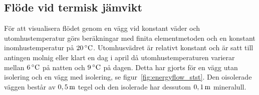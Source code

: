 \subsection{Flöde vid termisk jämvikt}
\label{sec:steadystatewall}


För att visualisera flödet genom en vägg vid konstant väder och utomhustemperatur görs 
beräkningar med finita elementmetoden och en konstant inomhustemperatur på 
$\unit[20]{^\circ C}$. Utomhusvädret är relativt konstant och är satt till antingen molnig 
eller klart en dag i april då utomhustemperaturen varierar mellan $\unit[6]{^\circ C}$ på natten och $\unit[9]{^\circ C}$ på dagen. Detta har gjorts för en vägg utan isolering och en vägg med 
isolering, se figur~\ref{fig:energyflow_stst}. Den oisolerade väggen består av 
$\unit[0,5]{m}$ tegel och den isolerade har dessutom $\unit[0,1]{m}$ mineralull. 

